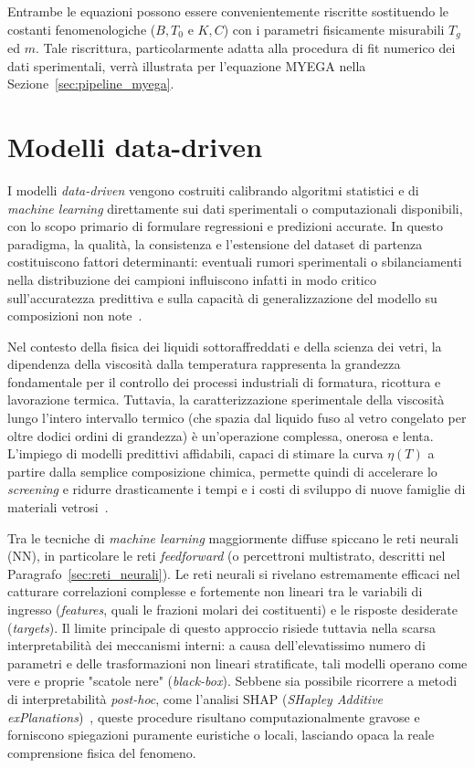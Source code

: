 \documentclass[../main.tex]{subfiles}
\begin{document}
	Entrambe le equazioni possono essere convenientemente riscritte sostituendo le costanti fenomenologiche ($B, T_0$ e $K, C$) con i parametri fisicamente misurabili $T_g$ ed $m$. Tale riscrittura, particolarmente adatta alla procedura di fit numerico dei dati sperimentali, verrà illustrata per l'equazione MYEGA nella Sezione~\ref{sec:pipeline_myega}.
	
	
	\section{Modelli data-driven}
	\label{sec:modelli_datadriven}
	
	I modelli \textit{data-driven} vengono costruiti calibrando algoritmi statistici e di \textit{machine learning} direttamente sui dati sperimentali o computazionali disponibili, con lo scopo primario di formulare regressioni e predizioni accurate. In questo paradigma, la qualità, la consistenza e l'estensione del dataset di partenza costituiscono fattori determinanti: eventuali rumori sperimentali o sbilanciamenti nella distribuzione dei campioni influiscono infatti in modo critico sull'accuratezza predittiva e sulla capacità di generalizzazione del modello su composizioni non note~\cite{torraChapter4Data2023}.
	
	Nel contesto della fisica dei liquidi sottoraffreddati e della scienza dei vetri, la dipendenza della viscosità dalla temperatura rappresenta la grandezza fondamentale per il controllo dei processi industriali di formatura, ricottura e lavorazione termica. Tuttavia, la caratterizzazione sperimentale della viscosità lungo l'intero intervallo termico (che spazia dal liquido fuso al vetro congelato per oltre dodici ordini di grandezza) è un'operazione complessa, onerosa e lenta. L'impiego di modelli predittivi affidabili, capaci di stimare la curva $\eta(T)$ a partire dalla semplice composizione chimica, permette quindi di accelerare lo \textit{screening} e ridurre drasticamente i tempi e i costi di sviluppo di nuove famiglie di materiali vetrosi~\cite{mauroGrandChallengesGlass2014}.
	
	Tra le tecniche di \textit{machine learning} maggiormente diffuse spiccano le reti neurali (NN), in particolare le reti \textit{feedforward} (o percettroni multistrato, descritti nel Paragrafo~\ref{sec:reti_neurali}). Le reti neurali si rivelano estremamente efficaci nel catturare correlazioni complesse e fortemente non lineari tra le variabili di ingresso (\textit{features}, quali le frazioni molari dei costituenti) e le risposte desiderate (\textit{targets}). Il limite principale di questo approccio risiede tuttavia nella scarsa interpretabilità dei meccanismi interni: a causa dell'elevatissimo numero di parametri e delle trasformazioni non lineari stratificate, tali modelli operano come vere e proprie "scatole nere" (\textit{black-box}). Sebbene sia possibile ricorrere a metodi di interpretabilità \textit{post-hoc}, come l'analisi SHAP (\textit{SHapley Additive exPlanations})~\cite{lundbergUnifiedApproachInterpreting2017}, queste procedure risultano computazionalmente gravose e forniscono spiegazioni puramente euristiche o locali, lasciando opaca la reale comprensione fisica del fenomeno.
	
\end{document}
